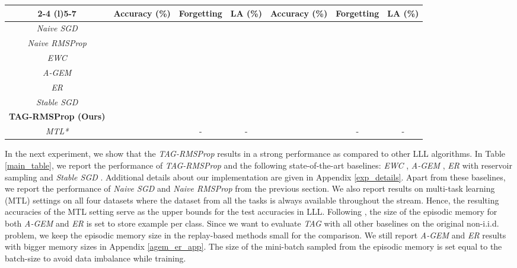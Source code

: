 \documentclass{article} \usepackage{collas2022_conference,times}
\begin{document}
\begin{table*}[t!]
{\begin{tabular}{c c c c c c c}
        \cmidrule(lr){2-4} \cmidrule(l){5-7}
             &  \textbf{Accuracy (\%)} & \textbf{Forgetting} & \textbf{LA (\%)} & \textbf{Accuracy (\%)} & \textbf{Forgetting} & \textbf{LA (\%)} \\
        \midrule
        \textit{Naive SGD} &  &  &   &  &  & \\
        \textit{Naive RMSProp} &   &  &  &  &  & \\
        \hline
        \textit{EWC} &  &  &  &  &  & \\
        \textit{A-GEM} &   &  &  &  &  & \\
        \textit{ER} &   &  &  &  &  &  \\
        \textit{Stable SGD} &  &  &  &  &  & \\
        \hline
        \textbf{TAG-RMSProp (Ours)} &  &  &  &  &  & \\
        \hline
        \textit{MTL*} &   &  - & - &   &  - & - \\
        \hline
        \end{tabular}}
        \label{main_table}
    \end{table*}


{ In the next experiment, we show that the \textit{TAG-RMSProp} results in a strong performance as compared to other LLL algorithms. In Table \ref{main_table}, we report the performance of \textit{TAG-RMSProp} and the following state-of-the-art baselines: \textit{EWC} \citep{kirkpatrick2017overcoming}, \textit{A-GEM} \citep{chaudhry2018efficient}, \textit{ER} \citep{aljundi2019online} with reservoir sampling and \textit{Stable SGD} \citep{mirzadeh2020understanding}. Additional details about our implementation are given in Appendix \ref{exp_details}.}
Apart from these baselines, we report the performance of \textit{Naive SGD} and \textit{Naive RMSProp} from the previous section. We also report results on multi-task learning (MTL) settings on all four datasets where the dataset from all the tasks is always available throughout the stream. Hence, the resulting accuracies of the MTL setting serve as the upper bounds for the test accuracies in LLL. Following \citet{mirzadeh2020understanding}, the size of the episodic memory for both \textit{A-GEM} and \textit{ER} is set to store  example per class. Since we want to evaluate \textit{TAG} with all other baselines on the original non-i.i.d. problem, we keep the episodic memory size in the replay-based methods small for the comparison. We still report \textit{A-GEM} and \textit{ER} results with bigger memory sizes in Appendix \ref{agem_er_app}. The size of the mini-batch sampled from the episodic memory is set equal to the batch-size to avoid data imbalance while training. 
\end{document}
